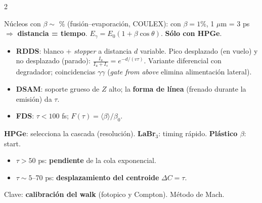 \documentclass[10pt,a4paper]{article}
\newcommand{\imp}[1]{\textbf{\color{BrickRed}#1}}
\begin{document}
\begin{multicols}{2}
\begin{clave}
Núcleos con $\beta\sim$ \% (fusión--evaporación, COULEX): con $\beta=1\%$, 1 $\mu$m = 3 ps $\Rightarrow$ \textbf{distancia = tiempo}.
$E_\gamma=E_0(1+\beta\cos\theta)$. \imp{Sólo con HPGe}.
\begin{itemize}
\item \textbf{RDDS}: blanco + \emph{stopper} a distancia $d$ variable. Pico desplazado (en vuelo) y no desplazado (parado):
$\displaystyle\frac{I_u}{I_u+I_s}=e^{-d/(v\tau)}$. Variante diferencial con degradador; coincidencias $\gamma\gamma$ (\emph{gate from above} elimina alimentación lateral).
\item \textbf{DSAM}: soporte grueso de $Z$ alto; la \textbf{forma de línea} (frenado durante la emisión) da $\tau$.
\item \textbf{FDS}: $\tau<100$ fs; $F(\tau)=\langle\beta\rangle/\beta_0$.
\end{itemize}
\end{clave}
\begin{clave}
\textbf{HPGe}: selecciona la cascada (resolución). \textbf{LaBr$_3$}: timing rápido. \textbf{Plástico $\beta$}: start.
\begin{itemize}
\item $\tau>50$ ps: \textbf{pendiente} de la cola exponencial.
\item $\tau\sim5$--70 ps: \textbf{desplazamiento del centroide} $\Delta C=\tau$.
\end{itemize}
Clave: \imp{calibración del walk} (fotopico y Compton). Método de Mach.
\end{clave}
\end{multicols}
\newpage

\end{document}
